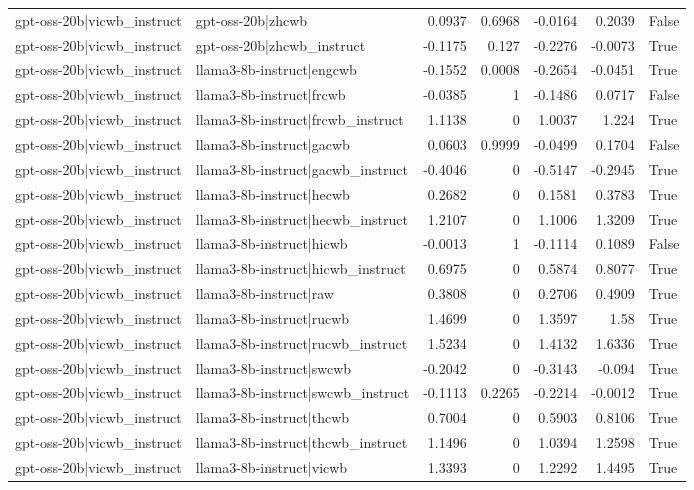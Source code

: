 \begin{table}
\begin{tabular}{l l r r r r l}
gpt-oss-20b|vicwb_instruct & gpt-oss-20b|zhcwb & 0.0937 & 0.6968 & -0.0164 & 0.2039 & False \\
gpt-oss-20b|vicwb_instruct & gpt-oss-20b|zhcwb_instruct & -0.1175 & 0.127 & -0.2276 & -0.0073 & True \\
gpt-oss-20b|vicwb_instruct & llama3-8b-instruct|engcwb & -0.1552 & 0.0008 & -0.2654 & -0.0451 & True \\
gpt-oss-20b|vicwb_instruct & llama3-8b-instruct|frcwb & -0.0385 & 1 & -0.1486 & 0.0717 & False \\
gpt-oss-20b|vicwb_instruct & llama3-8b-instruct|frcwb_instruct & 1.1138 & 0 & 1.0037 & 1.224 & True \\
gpt-oss-20b|vicwb_instruct & llama3-8b-instruct|gacwb & 0.0603 & 0.9999 & -0.0499 & 0.1704 & False \\
gpt-oss-20b|vicwb_instruct & llama3-8b-instruct|gacwb_instruct & -0.4046 & 0 & -0.5147 & -0.2945 & True \\
gpt-oss-20b|vicwb_instruct & llama3-8b-instruct|hecwb & 0.2682 & 0 & 0.1581 & 0.3783 & True \\
gpt-oss-20b|vicwb_instruct & llama3-8b-instruct|hecwb_instruct & 1.2107 & 0 & 1.1006 & 1.3209 & True \\
gpt-oss-20b|vicwb_instruct & llama3-8b-instruct|hicwb & -0.0013 & 1 & -0.1114 & 0.1089 & False \\
gpt-oss-20b|vicwb_instruct & llama3-8b-instruct|hicwb_instruct & 0.6975 & 0 & 0.5874 & 0.8077 & True \\
gpt-oss-20b|vicwb_instruct & llama3-8b-instruct|raw & 0.3808 & 0 & 0.2706 & 0.4909 & True \\
gpt-oss-20b|vicwb_instruct & llama3-8b-instruct|rucwb & 1.4699 & 0 & 1.3597 & 1.58 & True \\
gpt-oss-20b|vicwb_instruct & llama3-8b-instruct|rucwb_instruct & 1.5234 & 0 & 1.4132 & 1.6336 & True \\
gpt-oss-20b|vicwb_instruct & llama3-8b-instruct|swcwb & -0.2042 & 0 & -0.3143 & -0.094 & True \\
gpt-oss-20b|vicwb_instruct & llama3-8b-instruct|swcwb_instruct & -0.1113 & 0.2265 & -0.2214 & -0.0012 & True \\
gpt-oss-20b|vicwb_instruct & llama3-8b-instruct|thcwb & 0.7004 & 0 & 0.5903 & 0.8106 & True \\
gpt-oss-20b|vicwb_instruct & llama3-8b-instruct|thcwb_instruct & 1.1496 & 0 & 1.0394 & 1.2598 & True \\
gpt-oss-20b|vicwb_instruct & llama3-8b-instruct|vicwb & 1.3393 & 0 & 1.2292 & 1.4495 & True \\

\end{tabular}
\end{table}

